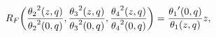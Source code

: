 \[\mathop{R_{F}\/}\nolimits\!\left(\frac{{\mathop{\theta_{2}\/}\nolimits^{2}}\!%
\left(z,q\right)}{{\mathop{\theta_{2}\/}\nolimits^{2}}\!\left(0,q\right)},%
\frac{{\mathop{\theta_{3}\/}\nolimits^{2}}\!\left(z,q\right)}{{\mathop{\theta_%
{3}\/}\nolimits^{2}}\!\left(0,q\right)},\frac{{\mathop{\theta_{4}\/}\nolimits^%
{2}}\!\left(z,q\right)}{{\mathop{\theta_{4}\/}\nolimits^{2}}\!\left(0,q\right)%
}\right)=\frac{\mathop{\theta_{1}\/}\nolimits'\!\left(0,q\right)}{\mathop{%
\theta_{1}\/}\nolimits\!\left(z,q\right)}z,\]
